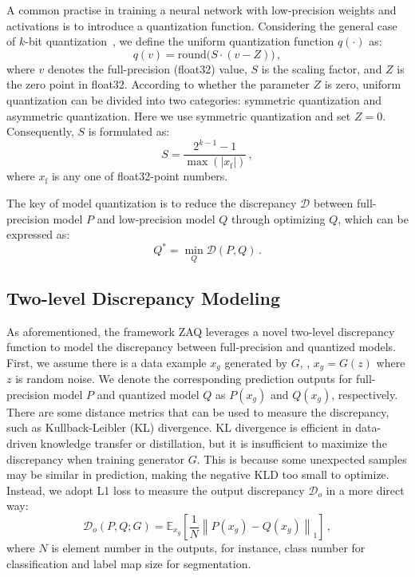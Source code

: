 \documentclass[final]{cvpr}
\begin{document}
A common practise in training a neural network with low-precision weights and activations is to introduce a quantization function. Considering the general case of $k$-bit quantization~\cite{zhou2016dorefa}, we define the uniform quantization function $q(\cdot)$ as:
\begin{equation}
  \label{eq:quant}
  q(v) = \mathrm{round}\big( S\cdot(v-Z) \big)\,,
\end{equation}
where $v$ denotes the full-precision (float32) value, $S$ is the scaling factor, and $Z$ is the zero point in float32. According to whether the parameter $Z$ is zero, uniform quantization can be divided into two categories: symmetric quantization and asymmetric quantization.
Here we use symmetric quantization and set $Z=0$. 
Consequently, $S$ is formulated as:
\begin{equation}
  S = \frac{2^{k-1}-1}{\max(|x_{\mathrm{f}}|)}\,,
\end{equation}
where $x_{\mathrm{f}}$ is any one of float32-point numbers.

The key of model quantization is to reduce the discrepancy $\mathcal{D}$ between full-precision model $P$ and low-precision model $Q$ through optimizing $Q$, which can be expressed as:
\begin{equation}\label{eq:quantization}
  Q^* = \min_{Q}\mathcal{D}(P, Q)\,.
\end{equation}


\subsection{Two-level Discrepancy Modeling}

As aforementioned, the framework ZAQ leverages a novel two-level discrepancy function to model the discrepancy between full-precision and quantized models.
First, we assume there is a data example $x_g$ generated by $G$, \ie, $x_g=G(z)$ where $z$ is random noise.
We denote the corresponding prediction outputs for full-precision model $P$ and quantized model $Q$ as $P(x_g)$ and $Q(x_g)$, respectively. There are some distance metrics that can be used to measure the discrepancy, such as Kullback-Leibler (KL) divergence.
KL divergence is efficient in data-driven knowledge transfer or distillation, but it is insufficient to maximize the discrepancy when training generator $G$.
This is because some unexpected samples may be similar in prediction, making the negative KLD too small to optimize.
Instead, we adopt L1 loss to measure the output discrepancy $\mathcal{D}_{o}$ in a more direct way:
\begin{equation}
  \label{eq:D_o}
  \mathcal{D}_{o}(P, Q ; G)=\mathbb{E}_{x_g} \left[\frac{1}{N}\left\| P(x_g)-Q(x_g) \right\|_{1} \right]\,,
\end{equation}
where $N$ is element number in the outputs, for instance, class number for classification and label map size for segmentation. 
\end{document}
